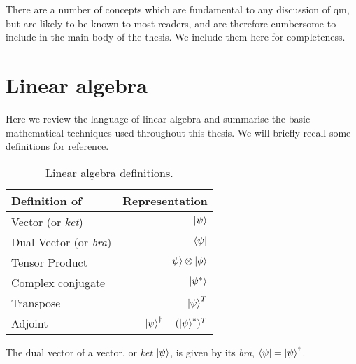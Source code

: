 There are a number of concepts which are fundamental to any discussion of \gls{qm}, 
    but are likely to be known to most readers, and are therefore cumbersome to include in the main body of the thesis. 
We include them here for completeness\footnotemark. 

\section{Linear algebra}\label{sec:linear_algebra}
Here we review the language of linear algebra and summarise the basic mathematical techniques used throughout this thesis.
We will briefly recall some definitions for reference. 

\begin{table}[h]
    \centering
    \begin{tabular}{lr}
        \hline 
        Definition of & Representation \\
        \hline 
        Vector (or \textit{ket})     & $\ket{\psi} $  \\
        Dual Vector (or \textit{bra}) & $\bra{\psi}  $ \\
        Tensor Product & $\ket{\psi} \otimes \ket{\phi}$ \\
        Complex conjugate & $\ket{\psi^{*}}$ \\
        Transpose & $\ket{\psi}^T $\\
        Adjoint & $\ket{\psi}^{\dag}  = (\ket{\psi}^{*})^{T}$\\
        \hline 
    \end{tabular}
    \caption[Linear algebra definitions]{Linear algebra definitions.}
    \label{table:linear_algebra}
\end{table}
The dual vector of a vector, or \emph{ket} $\ket{\psi}$, is given by its \emph{bra},  $\bra{\psi} = \ket{\psi}^{\dag}$. 

